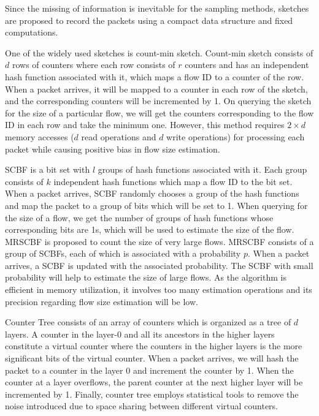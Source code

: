 Since the missing of information is inevitable for the sampling methods, sketches are proposed to record the packets using a compact data structure and fixed computations. 

One of the widely used sketches is count-min sketch\cite{cormode_countmin_2005}. Count-min sketch consists of $d$ rows of counters where each row consists of $r$ counters and has an independent hash function associated with it, which maps a flow ID to a counter of the row. When a packet arrives, it will be mapped to a counter in each row of the sketch, and the corresponding counters will be incremented by 1. On querying the sketch for the size of a particular flow, we will get the counters corresponding to the flow ID in each row and take the minimum one. However, this method requires $2\times d$ memory accesses ($d$ read operations and $d$ write operations) for processing each packet while causing positive bias in flow size estimation.

SCBF\cite{kumar_space-code_2004} is a bit set with $l$ groups of hash functions associated with it. Each group consists of $k$ independent hash functions which map a flow ID to the bit set. When a packet arrives, SCBF randomly chooses a group of the hash functions and map the packet to a group of bits which will be set to 1. When querying for the size of a flow, we get the number of groups of hash functions whose corresponding bits are 1s, which will be used to estimate the size of the flow. MRSCBF is proposed to count the size of very large flows. MRSCBF consists of a group of SCBFs, each of which is associated with a probability $p$. When a packet arrives, a SCBF is updated with the associated probability. The SCBF with small probability will help to estimate the size of large flows. As the algorithm is efficient in memory utilization, it involves too many estimation operations and its precision regarding flow size estimation will be low.

Counter Tree\cite{chen_counter_2017} consists of an array of counters which is organized as a tree of $d$ layers. A counter in the layer-0 and all its ancestors in the higher layers constitute a virtual counter where the counters in the higher layers is the more significant bits of the virtual counter. When a packet arrives, we will hash the packet to a counter in the layer 0 and increment the counter by 1. When the counter at a layer overflows, the parent counter at the next higher layer will be incremented by 1. Finally, counter tree employs statistical tools to remove the noise introduced due to space sharing between different virtual counters.  

